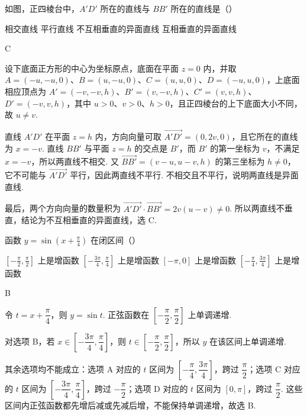 \begin{problem}
如图，正四棱台中，\(A'D'\) 所在的直线与 \(BB'\) 所在的直线是（\quad）


\choices
    {相交直线}
    {平行直线}
    {不互相垂直的异面直线}
    {互相垂直的异面直线}
\end{problem}

\begin{answer}
C
\end{answer}

\begin{solution}
设下底面正方形的中心为坐标原点，底面在平面 \(z=0\) 内，并取
\(A=(-u,-u,0)\)、\(B=(u,-u,0)\)、\(C=(u,u,0)\)、\(D=(-u,u,0)\)，上底面相应顶点为
\(A'=(-v,-v,h)\)、\(B'=(v,-v,h)\)、\(C'=(v,v,h)\)、\(D'=(-v,v,h)\)，其中 \(u>0\)、\(v>0\)、\(h>0\)，且正四棱台的上下底面大小不同，故 \(u\ne v\).

直线 \(A'D'\) 在平面 \(z=h\) 内，方向向量可取 \(\overrightarrow{A'D'}=(0,2v,0)\)，且它所在的直线为 \(x=-v\). 直线 \(BB'\) 与平面 \(z=h\) 的交点是 \(B'\)，而 \(B'\) 的第一坐标为 \(v\)，不满足 \(x=-v\)，所以两直线不相交. 又 \(\overrightarrow{BB'}=(v-u,u-v,h)\) 的第三坐标为 \(h\ne0\)，它不可能与 \(\overrightarrow{A'D'}\) 平行，因此两直线不平行. 不相交且不平行，说明两直线是异面直线.

最后，两个方向向量的数量积为
\(\overrightarrow{A'D'}\cdot\overrightarrow{BB'}=2v(u-v)\ne0\). 所以两直线不垂直，结论为不互相垂直的异面直线，选 C.
\end{solution}

\begin{problem}
函数 \(y = \sin\left(x+\frac{\pi}{4}\right)\) 在闭区间（\quad）

\choices
    {\(\left[-\frac{\pi}{2}, \frac{\pi}{2}\right]\) 上是增函数}
    {\(\left[-\frac{3\pi}{4}, \frac{\pi}{4}\right]\) 上是增函数}
    {\([-\pi,0]\) 上是增函数}
    {\(\left[-\frac{\pi}{4}, \frac{3\pi}{4}\right]\) 上是增函数}
\end{problem}

\begin{answer}
B
\end{answer}

\begin{solution}
令 \(t=x+\dfrac\pi4\)，则 \(y=\sin t\). 正弦函数在
\(\left[-\dfrac\pi2,\dfrac\pi2\right]\) 上单调递增.

对选项 B，若 \(x\in\left[-\dfrac{3\pi}{4},\dfrac\pi4\right]\)，则
\(t\in\left[-\dfrac\pi2,\dfrac\pi2\right]\)，所以 \(y\) 在该区间上单调递增.

其余选项均不能成立：选项 A 对应的 \(t\) 区间为 \(\left[-\dfrac\pi4,\dfrac{3\pi}4\right]\)，跨过 \(\dfrac\pi2\)；选项 C 对应的 \(t\) 区间为 \(\left[-\dfrac{3\pi}4,\dfrac\pi4\right]\)，跨过 \(-\dfrac\pi2\)；选项 D 对应的 \(t\) 区间为 \([0,\pi]\)，跨过 \(\dfrac\pi2\). 这些区间内正弦函数都先增后减或先减后增，不能保持单调递增，故选 B.
\end{solution}

